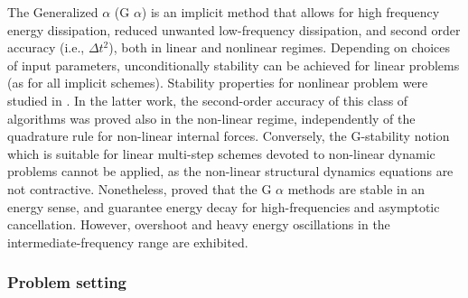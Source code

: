 \documentclass{report}
\begin{document}
The Generalized \textminus{} $\alpha$ (G \textminus{} $\alpha$)
is an implicit method that allows for high frequency energy dissipation,
reduced unwanted low-frequency dissipation, and second order accuracy
(i.e., $\Delta t^{2}$), both in linear and nonlinear regimes. Depending
on choices of input parameters, unconditionally stability can be achieved
for linear problems (as for all implicit schemes). Stability properties
for nonlinear problem were studied in \cite{erlicher2002analysis}. In
the latter work, the second-order accuracy of this class of algorithms
was proved also in the non-linear regime, independently of the quadrature
rule for non-linear internal forces. Conversely, the G-stability notion
which is suitable for linear multi-step schemes devoted to non-linear
dynamic problems cannot be applied, as the non-linear structural dynamics
equations are not contractive. Nonetheless, \cite{erlicher2002analysis}
proved that the G \textminus{} $\alpha$ methods are stable in an
energy sense, and guarantee energy decay for high-frequencies and
asymptotic cancellation. However, overshoot and heavy energy oscillations
in the intermediate-frequency range are exhibited.

\subsubsection{Problem setting}
\end{document}
